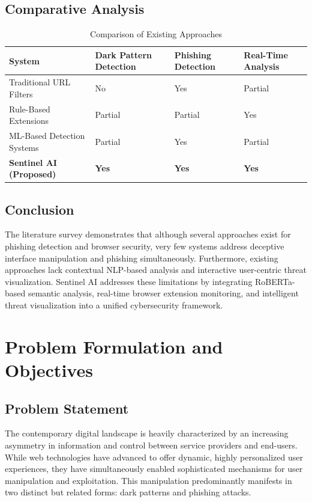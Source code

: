 \documentclass[12pt,a4paper]{report}
\begin{document}
\section{Comparative Analysis}
\begin{table}[H]
\centering
\caption{Comparison of Existing Approaches}
\vspace{0.2cm}
\renewcommand{\arraystretch}{1.4}
\begin{tabular}{|p{4.5cm}|p{3.5cm}|p{3.5cm}|p{3.5cm}|}
\hline
\textbf{System} & \textbf{Dark Pattern Detection} & \textbf{Phishing Detection} & \textbf{Real-Time Analysis} \\
\hline
Traditional URL Filters & No & Yes & Partial \\
\hline
Rule-Based Extensions & Partial & Partial & Yes \\
\hline
ML-Based Detection Systems & Partial & Yes & Partial \\
\hline
\textbf{Sentinel AI (Proposed)} & \textbf{Yes} & \textbf{Yes} & \textbf{Yes} \\
\hline
\end{tabular}
\end{table}

\section{Conclusion}
The literature survey demonstrates that although several approaches exist for phishing detection and browser security, very few systems address deceptive interface manipulation and phishing simultaneously. Furthermore, existing approaches lack contextual NLP-based analysis and interactive user-centric threat visualization. Sentinel AI addresses these limitations by integrating RoBERTa-based semantic analysis, real-time browser extension monitoring, and intelligent threat visualization into a unified cybersecurity framework.

\chapter{Problem Formulation and Objectives}

\section{Problem Statement}
The contemporary digital landscape is heavily characterized by an increasing asymmetry in information and control between service providers and end-users. While web technologies have advanced to offer dynamic, highly personalized user experiences, they have simultaneously enabled sophisticated mechanisms for user manipulation and exploitation. This manipulation predominantly manifests in two distinct but related forms: dark patterns and phishing attacks. 
\end{document}
